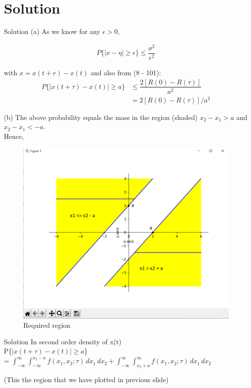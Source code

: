 \documentclass[15pt]{beamer}
\begin{document}
    \section{Solution}
    \begin{frame}{Solution}
        (a) As we know for any $\epsilon > 0$,
        \begin{center}
            \begin{align}
                P\{|x - \eta| \geq \epsilon \} \leq \dfrac{\sigma^2}{\epsilon^2}
            \end{align}
        \end{center}
        with $x = x(t + r) - x(t)$ and also from (8 - 101):
        \begin{align}
            P\{|x(t + \tau) - x(t)| \geq a \} &\leq \dfrac{2[R(0) - R(\tau)]}{a^2} \\
            &= 2[R(0) - R(\tau)]/a^2
        \end{align}
    \end{frame}
    \begin{frame}
        (b)
        The above probability equals the mass in the region (shaded) $x_2 - x_1 > a$ and $x_2 - x_1 < -a$.\\
        Hence,
    \end{frame}
    \begin{frame}
        \begin{figure}[h]
            \centering
            \includegraphics[width=\columnwidth]{Png file/fig.png}
            \caption{Required region}
            \label{fig.}
        \end{figure}
    \end{frame}
    \begin{frame}{Solution}
        In second order density of x(t)\\
        P\{$|x(t + \tau) - x(t)| \geq a $\} \\

        = $\int_{-\infty}^{\infty}\int_{-\infty}^{x_2 - a} f(x_1,x_2;\tau) \,dx_1\,dx_2 + \int_{-\infty}^{\infty}\int_{x_2 + a}^{\infty} f(x_1,x_2;\tau) \,dx_1\,dx_2$

         (This the region that we have plotted in previous slide)
    \end{frame}
\end{document}
